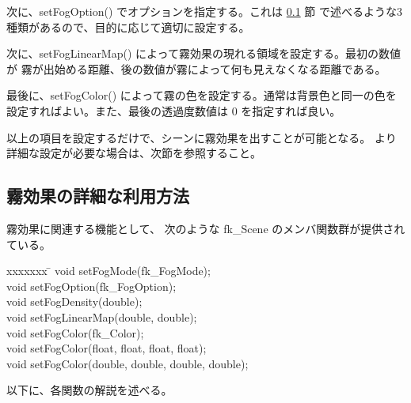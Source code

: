 次に、setFogOption() でオプションを指定する。これは \ref{sec:scenefogref} 節
で述べるような3種類があるので、目的に応じて適切に設定する。

次に、setFogLinearMap() によって霧効果の現れる領域を設定する。最初の数値が
霧が出始める距離、後の数値が霧によって何も見えなくなる距離である。

最後に、setFogColor() によって霧の色を設定する。通常は背景色と同一の色を
設定すればよい。また、最後の透過度数値は 0 を指定すれば良い。

以上の項目を設定するだけで、シーンに霧効果を出すことが可能となる。
より詳細な設定が必要な場合は、次節を参照すること。
\subsection{霧効果の詳細な利用方法} \label{sec:scenefogref}
霧効果に関連する機能として、
次のような fk\_Scene のメンバ関数群が提供されている。
\begin{bf}
\begin{tabbing}
xxxxxxx \= \kill
\> void setFogMode(fk\_FogMode); \\
\> void setFogOption(fk\_FogOption); \\
\> void setFogDensity(double); \\
\> void setFogLinearMap(double, double); \\
\> void setFogColor(fk\_Color); \\
\> void setFogColor(float, float, float, float); \\
\> void setFogColor(double, double, double, double); \\
\end{tabbing}
\end{bf}
以下に、各関数の解説を述べる。
